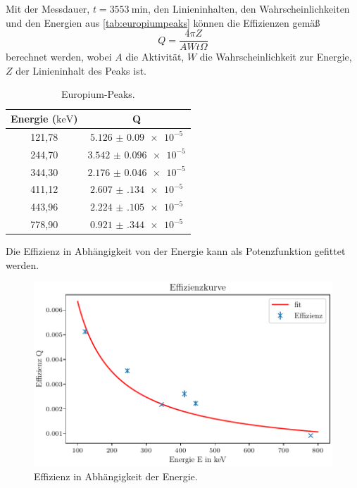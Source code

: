 Mit der Messdauer, $t = \SI{3553}{\minute}$, den Linieninhalten, den Wahrscheinlichkeiten und den Energien aus \ref{tab:europiumpeaks} können
die Effizienzen gemäß
\begin{equation}
    Q = \frac{4 \pi Z}{A W t \Omega}
    \label{eq:effizienz}
\end{equation}
berechnet werden, wobei $A$ die Aktivität, $W$ die Wahrscheinlichkeit zur Energie, $Z$ der Linieninhalt des Peaks ist.

\begin{table}[H]
    \centering
    \caption{Europium-Peaks.}
    \label{tab:europiumeffizienz}
    \begin{tabular}{c c}
        \toprule
        {Energie ($\si{\kilo\electronvolt}$)} & {Q} \\
        \midrule
        121,78 & $\num{5.126(90)e-5}$ \\
        244,70 & $\num{3.542(96)e-5}$ \\
        344,30 & $\num{2.176(46)e-5}$ \\
        411,12 & $\num{2.607(134)e-5}$ \\
        443,96 & $\num{2.224(105)e-5}$ \\
        778,90 & $\num{0.921(344)e-5}$ \\
        \bottomrule
    \end{tabular}
\end{table}

Die Effizienz in Abhängigkeit von der Energie kann als Potenzfunktion gefittet werden.

\begin{figure}[H]
    \centering
    \includegraphics[width=\textwidth]{plots/EuEffizienz.pdf}
    \caption{Effizienz in Abhängigkeit der Energie.}
    \label{fig:effizienz}
\end{figure}

